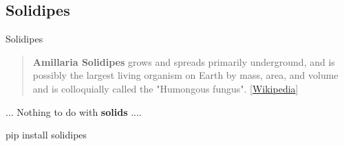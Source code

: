 \documentclass[10pt,compress,serif,aspectratio=169]{beamer}
\begin{document}
\subsection{Solidipes}
\begin{frame}[fragile]{Solidipes}

\begin{center}
\begin{quote}
  \textbf{Amillaria Solidipes} grows and spreads primarily underground, and is possibly the largest living organism on Earth by mass, area, and volume and is colloquially called the "Humongous fungus". [{\href{https://en.wikipedia.org/wiki/Armillaria_ostoyae}{Wikipedia}}]
\end{quote}
\end{center}
\pause
\vfill
\begin{center}
... Nothing to do with \textbf{solids} .... 
  \end{center}
\pause
\vspace{-.7cm}
\begin{block}{}
  \begin{center}
     pip install solidipes
\end{center}
\end{block}

\end{frame}


\end{document}
